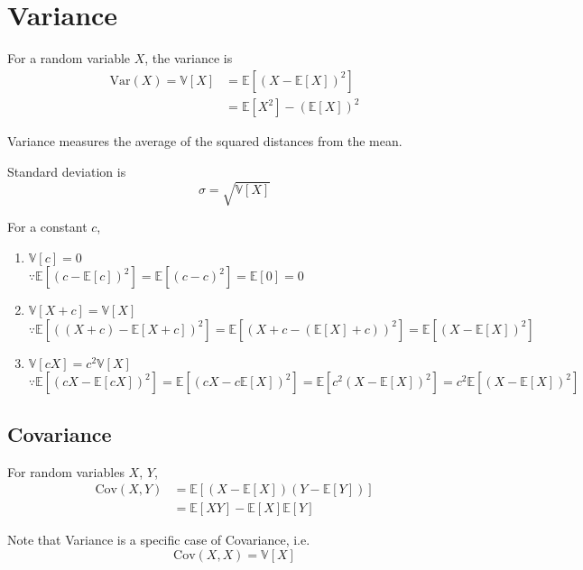 \documentclass[../Probability.tex]{subfiles}
\begin{document}
\section{Variance}
For a random variable $X$, the variance is
\begin{align*}
    \text{Var}(X)=\mathbb{V}[X] &= \mathbb{E}[(X - \mathbb{E}[X])^2] \\
    &=\mathbb{E}[X^2] - (\mathbb{E}[X])^2
\end{align*}

\noindent Variance measures the average of the squared distances from the mean.

\medskip
\noindent Standard deviation is
\[\sigma = \sqrt{\mathbb{V}[X]}\]

\medskip
\noindent For a constant $c$,
\begin{enumerate}
    \item $\mathbb{V}[c]=0$ \\[5pt]
    $\because\mathbb{E}[(c-\mathbb{E}[c])^2]=\mathbb{E}[(c-c)^2]=\mathbb{E}[0]=0$
    \item $\mathbb{V}[X+c] = \mathbb{V}[X]$ \\[5pt]
    $\because\mathbb{E}[((X+c)-\mathbb{E}[X+c])^2]=\mathbb{E}[(X+c-(\mathbb{E}[X]+c))^2]=\mathbb{E}[(X-\mathbb{E}[X])^2]$
    \item $\mathbb{V}[cX]=c^2\mathbb{V}[X]$ \\[5pt]
    $\because\mathbb{E}[(cX-\mathbb{E}[cX])^2]=\mathbb{E}[(cX-c\mathbb{E}[X])^2]=\mathbb{E}[c^2(X-\mathbb{E}[X])^2]=c^2\mathbb{E}[(X-\mathbb{E}[X])^2]$
\end{enumerate}

\subsection{Covariance}

For random variables $X$, $Y$,
\begin{align*}
    \text{Cov}(X,Y)&=\mathbb{E}[(X-\mathbb{E}[X])(Y-\mathbb{E}[Y])] \\
    &= \mathbb{E}[XY]-\mathbb{E}[X]\mathbb{E}[Y]
\end{align*}

\noindent Note that Variance is a specific case of Covariance, i.e.
\[\text{Cov}(X,X)=\mathbb{V}[X]\]
\end{document}
